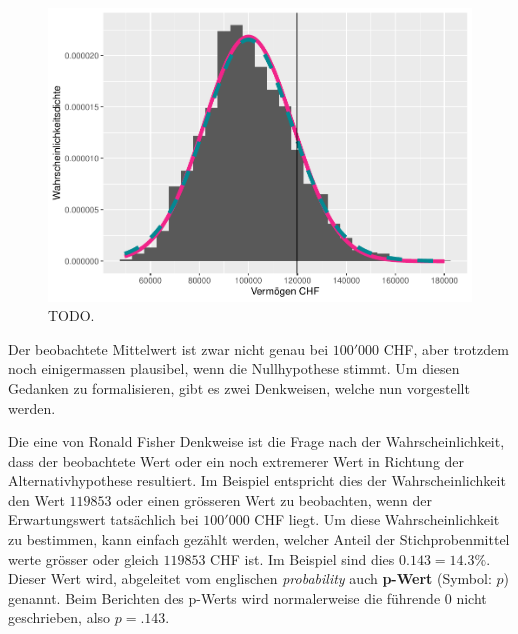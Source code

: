 \documentclass[
]{book}
\theoremstyle{definition}
\theoremstyle{definition}
\theoremstyle{definition}
\theoremstyle{definition}
\theoremstyle{remark}
\begin{document}
\begin{figure}
\centering
\includegraphics{aps_statistik1_files/figure-latex/exm-vermoegen-histogram-plot-1.pdf}
\caption{\label{fig:exm-vermoegen-histogram-plot}TODO.}
\end{figure}

Der beobachtete Mittelwert ist zwar nicht genau bei \(100'000\) CHF, aber trotzdem noch einigermassen plausibel, wenn die Nullhypothese stimmt. Um diesen Gedanken zu formalisieren, gibt es zwei Denkweisen, welche nun vorgestellt werden.

Die eine von Ronald Fisher Denkweise ist die Frage nach der Wahrscheinlichkeit, dass der beobachtete Wert oder ein noch extremerer Wert in Richtung der Alternativhypothese resultiert. Im Beispiel entspricht dies der Wahrscheinlichkeit den Wert \(119853\) oder einen grösseren Wert zu beobachten, wenn der Erwartungswert tatsächlich bei \(100'000\) CHF liegt. Um diese Wahrscheinlichkeit zu bestimmen, kann einfach gezählt werden, welcher Anteil der Stichprobenmittel werte grösser oder gleich \(119853\) CHF ist. Im Beispiel sind dies \(0.143 = 14.3\%\). \label{customdef-pwert}{Dieser Wert wird, abgeleitet vom englischen \emph{probability} auch \textbf{p-Wert} (Symbol: \(p\)) genannt. Beim Berichten des p-Werts wird normalerweise die führende \(0\) nicht geschrieben, also \(p = .143\).}
\end{document}
